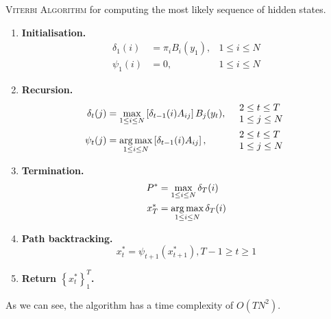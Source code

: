	\begin{algorithm}
		\caption{\textsc{Viterbi Algorithm} for computing the most likely sequence of hidden states.}
		\label{alg:viterbi}
		\begin{enumerate}
			\item
				\textbf{Initialisation.}
				\begin{align*}
					\delta_1(i) & = \pi_i B_i(y_1), & 1 \leq i \leq N \\
					\psi_1(i) & = 0, & 1 \leq i \leq N
				\end{align*}
			\item
				\textbf{Recursion.}
				\begin{align*}
					\delta_t(j) & = \max_{1 \leq i \leq N} \left[ \delta_{t - 1}(i) A_{ij} \right] B_j(y_t), &
					\begin{array}{lr}
						2 \leq t \leq T\\
						1 \leq j \leq N
					\end{array}\\
					\psi_t(j) & = \operatorname*{arg\,max}_{1 \leq i \leq N} \left[ \delta_{t - 1}(i) A_{ij} \right], &
					\begin{array}{lr}
						2 \leq t \leq T\\
						1 \leq j \leq N
					\end{array}
				\end{align*}
			\item
				\textbf{Termination.}
				\begin{align*}
					P^\ast & = \max_{1 \leq i \leq N} \delta_T(i)\\
					x_T^\ast & = \operatorname*{arg\,max}_{1 \leq i \leq N} \delta_T(i)
				\end{align*}
			\item
				\textbf{Path backtracking.}
				\begin{equation*}
					x_t^\ast = \psi_{t + 1}\left(x_{t + 1}^\ast \right),  T - 1 \geq t \geq 1
				\end{equation*}
			\item
				\textbf{Return $\left\{x_t^\ast \right\}_1^T$.}
		\end{enumerate}
	\end{algorithm}
	As we can see, the algorithm has a time complexity of $O(TN^2)$.

